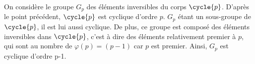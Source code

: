 \begin{enumerate}[label=\alph*)]
    On considère le groupe $G_p$ des éléments inversibles du corps $\cycle{p}$. D'après le point précédent, $\cycle{p}$ est cyclique d'ordre $p$. $G_p$ étant un sous-groupe de $\cycle{p}$, il est lui aussi cyclique. De plus, ce groupe est composé des éléments inversibles dans $\cycle{p}$, c'est à dire des éléments relativement premier à $p$, qui sont au nombre de $\varphi(p) = (p-1)$ car $p$ est premier. Ainsi, $G_p$ est cyclique d'ordre p-1.
\end{enumerate}